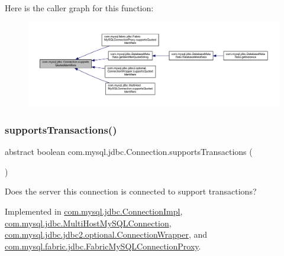 Here is the caller graph for this function\+:\nopagebreak
\begin{figure}[H]
\begin{center}
\leavevmode
\includegraphics[width=350pt]{interfacecom_1_1mysql_1_1jdbc_1_1_connection_a16e68907781a09083ff1afda25dff502_icgraph}
\end{center}
\end{figure}
\mbox{\label{interfacecom_1_1mysql_1_1jdbc_1_1_connection_a730de8090ab7cf2acfbcb2fefbd84ea2}} 
\subsubsection{\texorpdfstring{supports\+Transactions()}{supportsTransactions()}}
{\footnotesize\ttfamily abstract boolean com.\+mysql.\+jdbc.\+Connection.\+supports\+Transactions (\begin{DoxyParamCaption}{ }\end{DoxyParamCaption})\hspace{0.3cm}{\ttfamily [abstract]}}

Does the server this connection is connected to support transactions? 

Implemented in \mbox{\hyperlink{classcom_1_1mysql_1_1jdbc_1_1_connection_impl_a05086bca661351f54f5512f894effe81}{com.\+mysql.\+jdbc.\+Connection\+Impl}}, \mbox{\hyperlink{classcom_1_1mysql_1_1jdbc_1_1_multi_host_my_s_q_l_connection_a356916a7b3d5204fdd9886f9925816e7}{com.\+mysql.\+jdbc.\+Multi\+Host\+My\+S\+Q\+L\+Connection}}, \mbox{\hyperlink{classcom_1_1mysql_1_1jdbc_1_1jdbc2_1_1optional_1_1_connection_wrapper_a1f15bbe2ddf9ab93df95fd71932a0908}{com.\+mysql.\+jdbc.\+jdbc2.\+optional.\+Connection\+Wrapper}}, and \mbox{\hyperlink{classcom_1_1mysql_1_1fabric_1_1jdbc_1_1_fabric_my_s_q_l_connection_proxy_af9333983592d63be78de93ac477582c6}{com.\+mysql.\+fabric.\+jdbc.\+Fabric\+My\+S\+Q\+L\+Connection\+Proxy}}.


